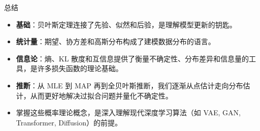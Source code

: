 \documentclass[12pt, aspectratio=169]{beamer}
\begin{document}
\begin{frame}{总结}
    \begin{itemize}
        \item \textbf{基础}：贝叶斯定理连接了先验、似然和后验，是理解模型更新的钥匙。
        \item \textbf{统计量}：期望、协方差和高斯分布构成了建模数据分布的语言。
        \item \textbf{信息论}：熵、KL 散度和互信息提供了衡量不确定性、分布差异和信息量的工具，是许多损失函数的理论基础。
        \item \textbf{推断}：从 MLE 到 MAP 再到全贝叶斯推断，我们逐渐从点估计走向分布估计，从而更好地解决过拟合问题并量化不确定性。
        \item 掌握这些概率理论概念，是深入理解现代深度学习算法（如 VAE, GAN, Transformer, Diffusion）的前提。
    \end{itemize}
\end{frame}
\end{document}
